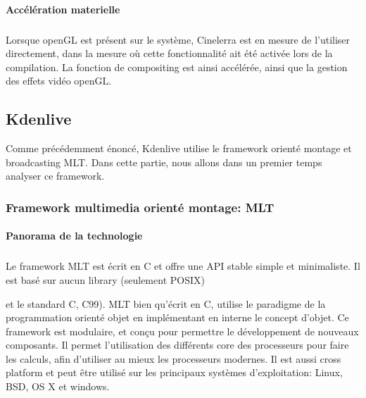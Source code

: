 \paragraph{Accélération materielle}

\subparagraph{}

Lorsque openGL est présent sur le système, Cinelerra
est en mesure de l'utiliser directement, dans la mesure où cette
fonctionnalité ait été activée lors de la compilation.
La fonction de compositing est ainsi accélérée, ainsi
que la gestion des effets vidéo openGL.





\subsection {Kdenlive}

Comme précédemment énoncé, Kdenlive utilise le framework orienté
montage et broadcasting MLT. Dans cette partie, nous allons dans un
premier temps analyser ce framework.

\subsubsection {Framework multimedia orienté montage: MLT}

\paragraph {Panorama de la technologie} %

\subparagraph{}

Le framework MLT est écrit en C et offre une API stable
simple et minimaliste. Il est basé sur aucun library (seulement POSIX)

 et le standard C, C99). MLT bien
qu'écrit en C, utilise le paradigme de la programmation orienté objet en
implémentant en interne le concept d'objet. Ce framework est modulaire,
et conçu pour permettre le développement de nouveaux composants. Il
permet l'utilisation des différents core des processeurs pour faire
les calculs, afin d'utiliser au mieux les processeurs modernes. Il est
aussi cross platform et peut être utilisé sur les principaux systèmes
d'exploitation: Linux, BSD, OS X et windows.

